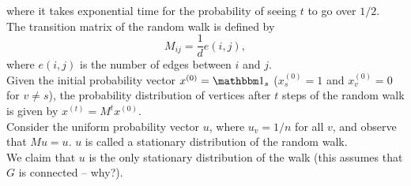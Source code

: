 			where it takes exponential time for the probability of seeing $t$ to go over $1/2$.\\

			The transition matrix of the random walk is defined by
			\[ M_{ij} = \frac{1}{d}e(i,j), \]
			where $e(i,j)$ is the number of edges between $i$ and $j$.\\
			Given the initial probability vector $x^{(0)} = \indic_s$ ($x^{(0)}_s = 1$ and $x^{(0)}_v = 0$ for $v \ne s$), the probability distribution of vertices after $t$ steps of the random walk is given by $x^{(t)} = M^tx^{(0)}$.\\
			Consider the uniform probability vector $u$, where $u_v = 1/n$ for all $v$, and observe that $Mu = u$. $u$ is called a stationary distribution of the random walk.\\
			We claim that $u$ is the only stationary distribution of the walk (this assumes that $G$ is connected -- why?).

